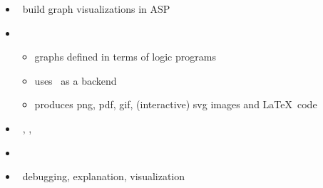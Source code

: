 \begin{frame}{\clingraph}
  \begin{itemize}
    \item {} \ build graph visualizations in ASP
    \item {}
      \begin{itemize}
      \item graphs defined in terms of logic programs %
      \item uses \graphviz\ as a backend
      \item produces png, pdf, gif, (interactive) svg images and \LaTeX\ code
      \end{itemize}
    \item {}   \ \clingo, \clorm, \graphviz
    \item {}   \ \cite{hasascst22a}
    \item {} \ debugging, explanation, visualization %
  \end{itemize}
\end{frame}
%
